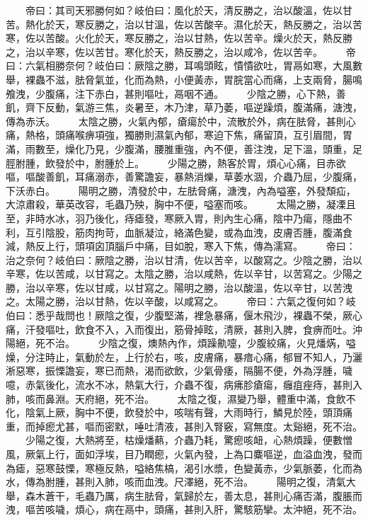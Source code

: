 　　帝曰：其司天邪勝何如？岐伯曰：風化於天，清反勝之，治以酸溫，佐以甘苦。熱化於天，寒反勝之，治以甘溫，佐以苦酸辛。濕化於天，熱反勝之，治以苦寒，佐以苦酸。火化於天，寒反勝之，治以甘熱，佐以苦辛。燥火於天，熱反勝之，治以辛寒，佐以苦甘。寒化於天，熱反勝之，治以咸冷，佐以苦辛。
　　帝曰：六氣相勝奈何？岐伯曰：厥陰之勝，耳鳴頭眩，憒憒欲吐，胃鬲如寒，大風數舉，裸蟲不滋，胠脅氣並，化而為熱，小便黃赤，胃脘當心而痛，上支兩脅，腸鳴飧洩，少腹痛，注下赤白，甚則嘔吐，鬲咽不通。
　　少陰之勝，心下熱，善飢，齊下反動，氣游三焦，炎暑至，木乃津，草乃萎，嘔逆躁煩，腹滿痛，溏洩，傳為赤沃。
　　太陰之勝，火氣內郁，瘡瘍於中，流散於外，病在胠脅，甚則心痛，熱格，頭痛喉痹項強，獨勝則濕氣內郁，寒迫下焦，痛留頂，互引眉間，胃滿，雨數至，燥化乃見，少腹滿，腰脽重強，內不便，善注洩，足下溫，頭重，足脛胕腫，飲發於中，胕腫於上。
　　少陽之勝，熱客於胃，煩心心痛，目赤欲嘔，嘔酸善飢，耳痛溺赤，善驚譫妄，暴熱消爍，草萎水涸，介蟲乃屈，少腹痛，下沃赤白。
　　陽明之勝，清發於中，左胠脅痛，溏洩，內為嗌塞，外發頹疝，大涼肅殺，華英改容，毛蟲乃殃，胸中不便，嗌塞而咳。
　　太陽之勝，凝凓且至，非時水冰，羽乃後化，痔瘧發，寒厥入胃，則內生心痛，陰中乃瘍，隱曲不利，互引陰股，筋肉拘苛，血脈凝泣，絡滿色變，或為血洩，皮膚否腫，腹滿食減，熱反上行，頭項囟頂腦戶中痛，目如脫，寒入下焦，傳為濡寫。
　　帝曰：治之奈何？岐伯曰：厥陰之勝，治以甘清，佐以苦辛，以酸寫之。少陰之勝，治以辛寒，佐以苦咸，以甘寫之。太陰之勝，治以咸熱，佐以辛甘，以苦寫之。少陽之勝，治以辛寒，佐以甘咸，以甘寫之。陽明之勝，治以酸溫，佐以辛甘，以苦洩之。太陽之勝，治以甘熱，佐以辛酸，以咸寫之。
　　帝曰：六氣之復何如？岐伯曰：悉乎哉問也！厥陰之復，少腹堅滿，裡急暴痛，偃木飛沙，裸蟲不榮，厥心痛，汗發嘔吐，飲食不入，入而復出，筋骨掉眩，清厥，甚則入脾，食痹而吐。沖陽絕，死不治。
　　少陰之復，燠熱內作，煩躁鼽嚏，少腹絞痛，火見燔焫，嗌燥，分注時止，氣動於左，上行於右，咳，皮膚痛，暴瘖心痛，郁冒不知人，乃灑淅惡寒，振慄譫妄，寒已而熱，渴而欲飲，少氣骨痿，隔腸不便，外為浮腫，噦噫，赤氣後化，流水不冰，熱氣大行，介蟲不復，病疿胗瘡瘍，癰疽痤痔，甚則入肺，咳而鼻淵。天府絕，死不治。
　　太陰之復，濕變乃舉，體重中滿，食飲不化，陰氣上厥，胸中不便，飲發於中，咳喘有聲，大雨時行，鱗見於陸，頭頂痛重，而掉瘛尤甚，嘔而密默，唾吐清液，甚則入腎竅，寫無度。太谿絕，死不治。
　　少陽之復，大熱將至，枯燥燔爇，介蟲乃耗，驚瘛咳衄，心熱煩躁，便數憎風，厥氣上行，面如浮埃，目乃瞤瘛，火氣內發，上為口麋嘔逆，血溢血洩，發而為瘧，惡寒鼓慄，寒極反熱，嗌絡焦槁，渴引水漿，色變黃赤，少氣脈萎，化而為水，傳為胕腫，甚則入肺，咳而血洩。尺澤絕，死不治。
　　陽明之復，清氣大舉，森木蒼干，毛蟲乃厲，病生胠脅，氣歸於左，善太息，甚則心痛否滿，腹脹而洩，嘔苦咳噦，煩心，病在鬲中，頭痛，甚則入肝，驚駭筋攣。太沖絕，死不治。
